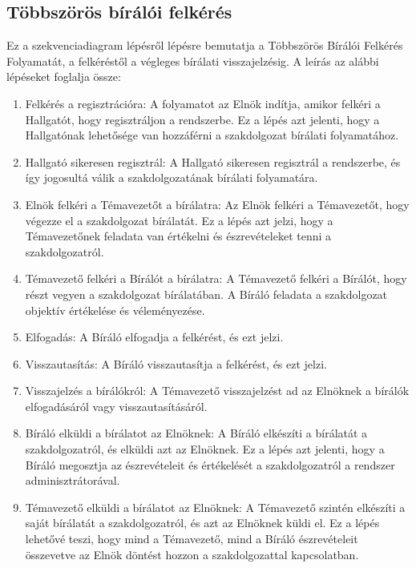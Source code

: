 \documentclass[a4paper,12pt]{article}
\begin{document}
\subsection{Többszörös bírálói felkérés}

Ez a szekvenciadiagram lépésről lépésre bemutatja a Többszörös Bírálói Felkérés Folyamatát, a felkéréstől a végleges bírálati visszajelzésig. A leírás az alábbi lépéseket foglalja össze:

\begin{enumerate}
\item Felkérés a regisztrációra: A folyamatot az Elnök indítja, amikor felkéri a Hallgatót, hogy regisztráljon a rendszerbe. Ez a lépés azt jelenti, hogy a Hallgatónak lehetősége van hozzáférni a szakdolgozat bírálati folyamatához.

\item Hallgató sikeresen regisztrál: A Hallgató sikeresen regisztrál a rendszerbe, és így jogosultá válik a szakdolgozatának bírálati folyamatára.

\item Elnök felkéri a Témavezetőt a bírálatra: Az Elnök felkéri a Témavezetőt, hogy végezze el a szakdolgozat bírálatát. Ez a lépés azt jelzi, hogy a Témavezetőnek feladata van értékelni és észrevételeket tenni a szakdolgozatról.

\item Témavezető felkéri a Bírálót a bírálatra: A Témavezető felkéri a Bírálót, hogy részt vegyen a szakdolgozat bírálatában. A Bíráló feladata a szakdolgozat objektív értékelése és véleményezése.

\item Elfogadás: A Bíráló elfogadja a felkérést, és ezt jelzi.

\item Visszautasítás: A Bíráló visszautasítja a felkérést, és ezt jelzi.

\item Visszajelzés a bírálókról: A Témavezető visszajelzést ad az Elnöknek a bírálók elfogadásáról vagy visszautasításáról.

\item Bíráló elküldi a bírálatot az Elnöknek: A Bíráló elkészíti a bírálatát a szakdolgozatról, és elküldi azt az Elnöknek. Ez a lépés azt jelenti, hogy a Bíráló megosztja az észrevételeit és értékelését a szakdolgozatról a rendszer adminisztrátorával.

\item Témavezető elküldi a bírálatot az Elnöknek: A Témavezető szintén elkészíti a saját bírálatát a szakdolgozatról, és azt az Elnöknek küldi el. Ez a lépés lehetővé teszi, hogy mind a Témavezető, mind a Bíráló észrevételeit összevetve az Elnök döntést hozzon a szakdolgozattal kapcsolatban.
\end{enumerate}
\end{document}
